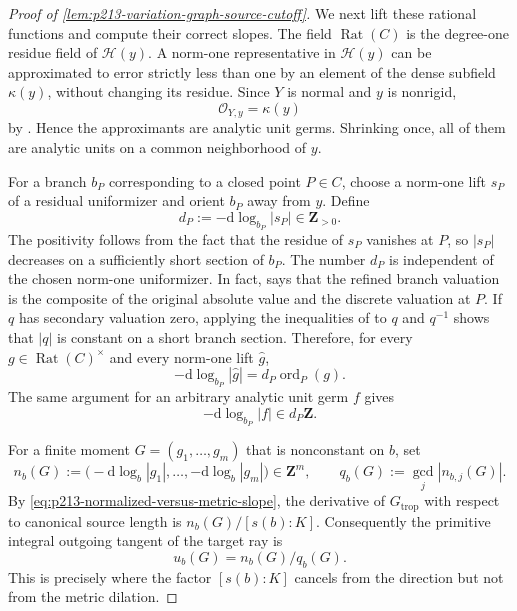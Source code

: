 \begin{proof}[Proof of
\cref{lem:p213-variation-graph-source-cutoff}]
We next lift these rational functions and compute their correct slopes.
The field $\operatorname{Rat}(C)$ is the degree-one residue field of
$\mathcal H(y)$.  A norm-one representative in $\mathcal H(y)$ can be
approximated to error strictly less than one by an element of the dense
subfield $\kappa(y)$, without changing its residue.  Since $Y$ is normal
and $y$ is nonrigid,
\begin{equation}
                         \mathcal O_{Y,y}=\kappa(y)
\label{eq:p213-variation-normal-local-field-revised}
\end{equation}
by \cite[\S4.2.18]{Ducros24CurveStructure}.  Hence the approximants are
analytic unit germs.  Shrinking once, all of them are analytic units on a
common neighborhood of $y$.

For a branch $b_P$ corresponding to a closed point $P\in C$, choose a
norm-one lift $s_P$ of a residual uniformizer and orient $b_P$ away from
$y$.  Define
\begin{equation}
             d_P:=-\mathrm d\log_{b_P}|s_P|\in\mathbf Z_{>0}.
\label{eq:p213-variation-integral-branch-weight}
\end{equation}
The positivity follows from the fact that the residue of $s_P$ vanishes
at $P$, so $|s_P|$ decreases on a sufficiently short section of $b_P$.
The number $d_P$ is independent of the chosen norm-one uniformizer.  In
fact, \cite[\S4.2.11.1]{Ducros24CurveStructure} says that the refined
branch valuation is the composite of the original absolute value and the
discrete valuation at $P$.  If $q$ has secondary valuation zero, applying
the inequalities of \cite[\S4.2.6]{Ducros24CurveStructure} to $q$ and
$q^{-1}$ shows that $|q|$ is constant on a short branch section.  Therefore,
for every $g\in\operatorname{Rat}(C)^\times$ and every norm-one lift
$\widehat g$,
\begin{equation}
       -\mathrm d\log_{b_P}|\widehat g|
                 =d_P\operatorname{ord}_P(g).
\label{eq:p213-variation-residual-normalized-slope}
\end{equation}
The same argument for an arbitrary analytic unit germ $f$ gives
\[
                  -\mathrm d\log_{b_P}|f|\in d_P\mathbf Z.
\]

For a finite moment $G=(g_1,\ldots,g_m)$ that is nonconstant on $b$, set
\begin{equation}
 n_b(G):=\bigl(-\mathrm d\log_b|g_1|,\ldots,
                    -\mathrm d\log_b|g_m|\bigr)\in\mathbf Z^m,
 \qquad q_b(G):=\gcd_j|n_{b,j}(G)|.
\label{eq:p213-integral-slope-vector}
\end{equation}
By \eqref{eq:p213-normalized-versus-metric-slope}, the derivative of
$G_{\mathrm{trop}}$ with respect to canonical source length is
$n_b(G)/[s(b):K]$.  Consequently the primitive integral outgoing tangent
of the target ray is
\begin{equation}
                              u_b(G)=n_b(G)/q_b(G).
\label{eq:p213-primitive-integral-tangent}
\end{equation}
This is precisely where the factor $[s(b):K]$ cancels from the direction
but not from the metric dilation.


\end{proof}
